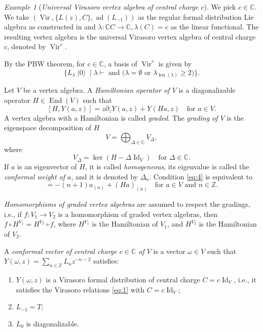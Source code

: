 \documentclass[a4paper, 12pt, reqno]{amsart}
\theoremstyle{remark}
\newtheorem{example}[theorem]{Example}
\DeclareMathOperator{\Vir}{Vir}
\DeclareMathOperator{\len}{len}
\DeclareMathOperator{\vac}{|0\rangle}
\DeclareMathOperator{\ad}{ad}
\DeclareMathOperator{\End}{End}
\DeclareMathOperator{\Id}{Id}
\begin{document}
\begin{example}[\emph{Universal Virasoro vertex algebra of central charge $c$}]
  \label{exa:8}
  We pick $c \in \mathbb{C}$.
  We take $(\Vir, \{L(z), C\}, \ad(L_{-1}))$ as the regular formal distribution Lie algebra as constructed in  and $\lambda: \mathbb{C}C \to \mathbb{C}, \lambda(C) = c$ as the linear functional.
  The resulting vertex algebra is the universal Virasoro vertex algebra of central charge $c$, denoted by $\Vir^c$.

  By the PBW theorem, for $c \in \mathbb{C}$, a basis of $\Vir^c$ is given by
  \begin{equation*}
    \{L_{\lambda}\vac \mid \text{$\lambda \vdash$ and ($\lambda = \emptyset$ or $\lambda_{\len(\lambda)} \ge 2$)}\}.
  \end{equation*}
\end{example}

Let $V$ be a vertex algebra.
A \emph{Hamiltonian operator of $V$} is a diagonalizable operator $H \in \End(V)$ such that
\begin{equation}
  \label{eq:4}
  [H, Y(a, z)] = z\partial_zY(a, z) + Y(Ha, z) \quad \text{for $a \in V$}.
\end{equation}
A vertex algebra with a Hamiltonian is called \emph{graded}.
The \emph{grading of $V$} is the eigenspace decomposition of $H$
\begin{equation*}
  V = \bigoplus_{\Delta \in \mathbb{C}}V_{\Delta},
\end{equation*}
where
\begin{equation*}
  V_{\Delta} = \ker(H - \Delta\Id_V) \quad \text{for $\Delta \in \mathbb{C}$}.
\end{equation*}
If $a$ is an eigenvector of $H$, it is called \emph{homogeneous}, its eigenvalue is called the \emph{conformal weight of $a$}, and it is denoted by $\Delta_a$.
Condition \eqref{eq:4} is equivalent to
\begin{equation*}
  [H, a_{(n)}] = -(n + 1)a_{(n)} + (Ha)_{(n)} \quad \text{for $a \in V$ and $n \in \mathbb{Z}$}.
\end{equation*}

\emph{Homomorphisms of graded vertex algebras} are assumed to respect the gradings, i.e., if $f: V_1 \to V_2$ is a homomorphism of graded vertex algebras, then $f\circ H^{V_1} = H^{V_2}\circ f$, where $H^{V_1}$ is the Hamiltonian of $V_1$, and $H^{V_2}$ is the Hamiltonian of $V_2$.

A \emph{conformal vector of central charge $c \in \mathbb{C}$ of $V$} is a vector $\omega \in V$ such that $Y(\omega, z) = \sum_{n \in \mathbb{Z}}L_nz^{-n - 2}$ satisfies:
\begin{enumerate}
\item $Y(\omega, z)$ is a Virasoro formal distribution of central charge $C = c\Id_V$, i.e., it satisfies the Virasoro relations \eqref{eq:1} with $C = c\Id_V$;
\item $L_{-1} = T$;
\item $L_0$ is diagonalizable.
\end{enumerate}
\end{document}
